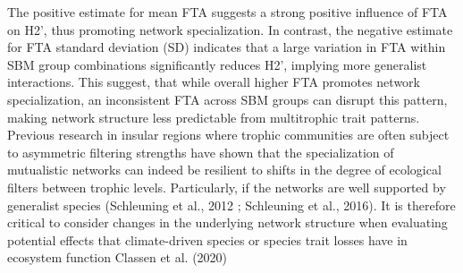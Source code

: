 \documentclass[
]{agujournal2019}
\begin{document}
The positive estimate for mean FTA suggests a strong positive influence
of FTA on H2', thus promoting network specialization. In contrast, the
negative estimate for FTA standard deviation (SD) indicates that a large
variation in FTA within SBM group combinations significantly reduces
H2', implying more generalist interactions. This suggest, that while
overall higher FTA promotes network specialization, an inconsistent FTA
across SBM groups can disrupt this pattern, making network structure
less predictable from multitrophic trait patterns. Previous research in
insular regions where trophic communities are often subject to
asymmetric filtering strengths have shown that the specialization of
mutualistic networks can indeed be resilient to shifts in the degree of
ecological filters between trophic levels. Particularly, if the networks
are well supported by generalist species (Schleuning et al., 2012 ;
Schleuning et al., 2016). It is therefore critical to consider changes
in the underlying network structure when evaluating potential effects
that climate-driven species or species trait losses have in ecosystem
function Classen et al. (2020)
\end{document}

